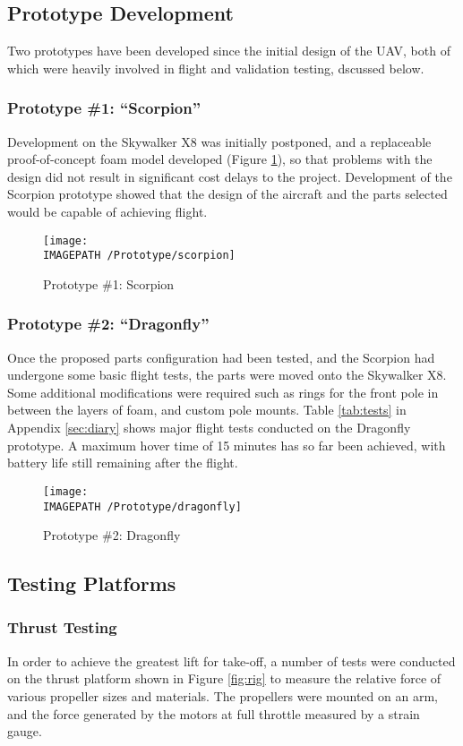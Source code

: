 \subsection{Prototype Development}
Two prototypes have been developed since the initial design of the UAV, both of which were heavily involved in flight and validation testing, dscussed below.

\subsubsection*{Prototype \#1: ``Scorpion''}
Development on the Skywalker X8 was initially postponed, and a replaceable proof-of-concept foam model developed (Figure \ref{fig:scorpion}), so that problems with the design did not result in significant cost delays to the project. Development of the Scorpion prototype showed that the design of the aircraft and the parts selected would be capable of achieving flight.

\begin{figure}[!ht]
	\centering
	\texttt{[image: \\IMAGEPATH /Prototype/scorpion]}
	\caption{Prototype \#1: Scorpion }
	\label{fig:scorpion}
\end{figure}

\subsubsection*{Prototype \#2: ``Dragonfly''}
Once the proposed parts configuration had been tested, and the Scorpion had undergone some basic flight tests, the parts were moved onto the Skywalker X8. Some additional modifications were required such as rings for the front pole in between the layers of foam, and custom pole mounts. Table \ref{tab:tests} in Appendix \ref{sec:diary} shows major flight tests conducted on the Dragonfly prototype. A maximum hover time of 15 minutes has so far been achieved, with battery life still remaining after the flight.  

\begin{figure}[!ht]
	\centering
	\texttt{[image: \\IMAGEPATH /Prototype/dragonfly]}
	\caption{Prototype \#2: Dragonfly }
	\label{fig:dragonfly}
\end{figure}

\subsection{Testing Platforms}
\subsubsection*{Thrust Testing}
\label{sec:thrust}
In order to achieve the greatest lift for take-off, a number of tests were conducted on the thrust platform shown in Figure \ref{fig:rig} to measure the relative force of various propeller sizes and materials. The propellers were mounted on an arm, and the force generated by the motors at full throttle measured by a strain gauge.\\

